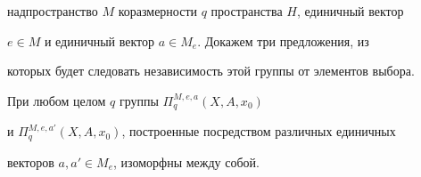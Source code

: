 надпространство $M$ коразмерности $q$ пространства $H$, единичный вектор 


$e\in M$ и единичный вектор $a\in M_e$. Докажем три предложения, из 


которых будет следовать независимость этой группы от элементов выбора. 


 


\begin{prop} 


При любом целом $q$ группы $\Pi^{M,e,a}_q(X,A,x_0)$ 


и $\Pi^{M,e,a'}_q(X,A,x_0)$, построенные посредством различных единичных 


векторов $a,a'\in M_e$, изоморфны между собой. 


\end{prop} 


 



